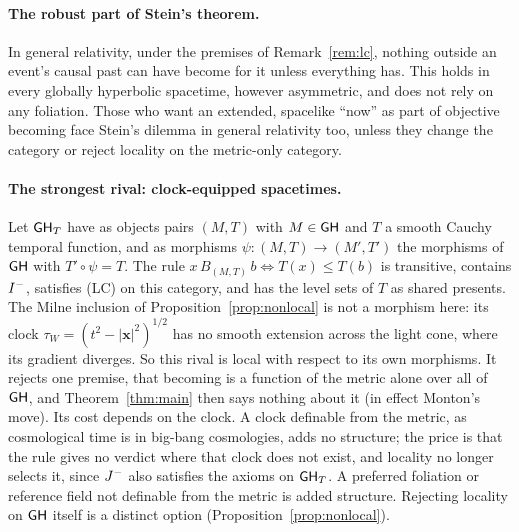 \paragraph{The robust part of Stein's theorem.} In general relativity, under
the premises of Remark~\ref{rem:lc}, nothing outside an event's causal past
can have become for it unless everything has. This holds in every globally
hyperbolic spacetime, however asymmetric, and does not rely on any foliation.
Those who want an extended, spacelike ``now'' as part of objective becoming
face Stein's dilemma in general relativity too, unless they change the
category or reject locality on the metric-only category.

\paragraph{The strongest rival: clock-equipped spacetimes.} Let $\mathsf{GH}_T$ have as
objects pairs $(M,T)$ with $M\in\mathsf{GH}$ and $T$ a smooth Cauchy temporal function, and
as morphisms $\psi:(M,T)\to(M',T')$ the morphisms of $\mathsf{GH}$ with $T'\circ\psi=T$. The
rule $x\,B_{(M,T)}\,b\iff T(x)\le T(b)$ is transitive, contains $I^{-}$, satisfies
(LC) on this category, and has the level sets of $T$ as shared presents. The
Milne inclusion of Proposition~\ref{prop:nonlocal} is not a morphism here: its
clock $\tau_W=(t^2-|\mathbf x|^2)^{1/2}$ has no smooth extension across the light
cone, where its gradient diverges. So this rival is local with respect to
its own morphisms. It rejects one premise, that becoming is a function of the
metric alone over all of $\mathsf{GH}$, and Theorem~\ref{thm:main} then says nothing about
it (in effect Monton's move). Its cost depends on the clock. A clock definable
from the metric, as cosmological time is in big-bang cosmologies, adds no
structure; the price is that the rule gives no verdict where that clock does
not exist, and locality no longer selects it, since $J^{-}$ also satisfies the
axioms on $\mathsf{GH}_T$. A preferred foliation or reference field not definable
from the metric is added structure. Rejecting locality on $\mathsf{GH}$ itself is a
distinct option (Proposition~\ref{prop:nonlocal}).

